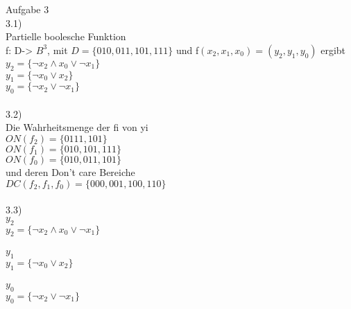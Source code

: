 \documentclass[11pt,a4paper]{article}
\begin{document}
Aufgabe 3 \\
3.1)\\
Partielle boolesche Funktion  \\
f: D-> $B^3$, mit $D= \lbrace 010,011,101,111 \rbrace$ und f$( x_2,x_1,x_0)=(y_2,y_1,y_0)$ ergibt\\
$y_2 = \lbrace \neg x_2 \wedge x_0 \vee \neg x_1 \rbrace $\\
$y_1 = \lbrace \neg x_0 \vee x_2 \rbrace $\\
$y_0 = \lbrace \neg x_2 \vee \neg x_1 \rbrace $\\ \\
3.2)\\
Die Wahrheitsmenge der fi von yi \\
$ON(f_2)=\lbrace 0111,101 \rbrace $\\
$ON(f_1)=\lbrace 010,101,111 \rbrace $\\
$ON(f_0)= \lbrace 010,011,101 \rbrace $\\
und deren Don't care Bereiche \\
$DC(f_2,f_1,f_0)= \lbrace 000,001,100,110 \rbrace $\\ \\ 
3.3)\\
$y_2$\\
$y_2 = \lbrace \neg x_2 \wedge x_0 \vee \neg x_1 \rbrace $\\ \\
$y_1$\\
$y_1 = \lbrace \neg x_0 \vee x_2 \rbrace $\\ \\
$y_0$\\
$y_0 = \lbrace \neg x_2 \vee \neg x_1 \rbrace $\\ \\
\end{document}
